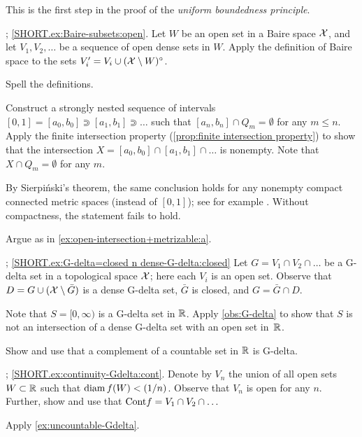 This is the first step in the proof of the \emph{uniform boundedness principle}.

\parbf{\ref{ex:Baire-subsets}};
\ref{SHORT.ex:Baire-subsets:open}.
Let $W$ be an open set in a Baire space $\mathcal{X}$, and let $V_1,V_2,\ldots$ be a sequence of open dense sets in $W$.
Apply the definition of Baire space to the sets $V_i'=V_i\cup (\mathcal{X}\setminus W)^\circ$.

Spell the definitions.

Construct a strongly nested sequence of intervals $[0,1]=[a_0,b_0]\Supset[a_1,b_1]\Supset\dots$ such that $[a_n,b_n]\cap Q_m=\emptyset$ for any $m\le n$.
Apply the finite intersection property (\ref{prop:finite intersection property}) to show that the intersection $X=[a_0,b_0]\cap [a_1,b_1]\cap\dots$ is nonempty.
Note that $X\cap Q_m=\emptyset$ for any $m$.

By Sierpiński's theorem, the same conclusion holds for any nonempty compact connected metric spaces (instead of $[0,1]$); see for example \cite[5.16]{nadler}.
Without compactness, the statement fails to hold.

 Argue as in \ref{ex:open-intersection+metrizable:a}.

\parbf{\ref{ex:G-delta=closed n dense-G-delta}}; \ref{SHORT.ex:G-delta=closed n dense-G-delta:closed}
Let $G=V_1\cap V_2\cap\dots$ be a G-delta set in a topological space $\mathcal{X}$; here each $V_i$ is an open set.
Observe that $D=G\cup (\mathcal{X}\setminus \bar G)$ is a dense G-delta set, $\bar G$ is closed, and
$G=\bar G\cap D$.

Note that $S=[0,\infty)$ is a G-delta set in $\mathbb{R}$.
Apply \ref{obs:G-delta} to show that $S$ is not an intersection of a dense G-delta set with an open set in~$\mathbb{R}$.


Show and use that a complement of a countable set in $\mathbb{R}$ is G-delta.

\parbf{\ref{ex:continuity-Gdelta}};
\ref{SHORT.ex:continuity-Gdelta:cont}.
Denote by $V_n$ the union of all open sets $W\subset \mathbb{R}$ such that $\mathrm{diam}\, f(W)<(1/n)$.
Observe that $V_n$ is open for any $n$.
Further, show and use that $\mathrm{Cont} f=V_1\cap V_2\cap\ldots$

 Apply \ref{ex:uncountable-Gdelta}.

